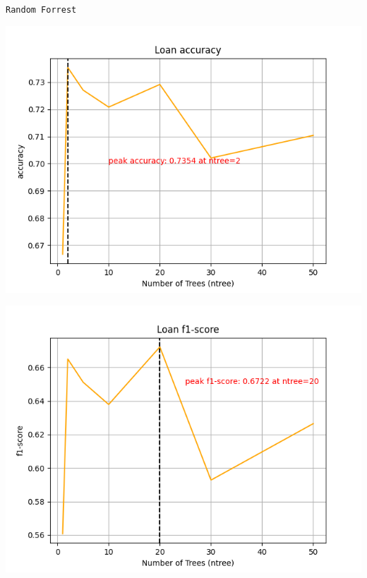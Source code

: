 \documentclass{article}
\begin{document}
\begin{center}
    \texttt{Random Forrest}
\end{center}
\begin{minipage}{0.49\textwidth}
    \centering

    \includegraphics*[width=\textwidth]{./src/figures/Loan-accuracy_final.png}
    
\end{minipage}
\hfill
\begin{minipage}{0.49\textwidth}
    \centering
    \includegraphics*[width=\textwidth]{./src/figures/Loan-f1-score_final.png}
\end{minipage}
\end{document}
